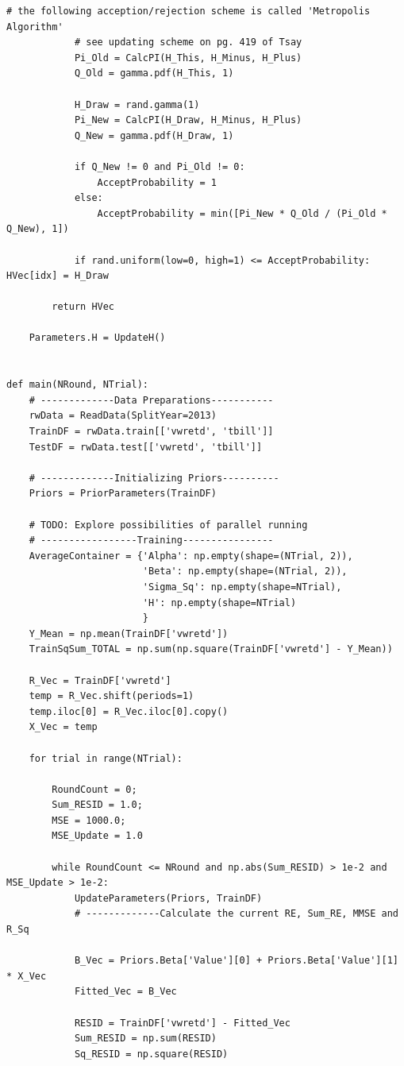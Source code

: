 \documentclass[letterpaper]{article}
\begin{document}
\begin{lstlisting}[label=lst:pythoncode]
            # the following acception/rejection scheme is called 'Metropolis Algorithm'
            # see updating scheme on pg. 419 of Tsay
            Pi_Old = CalcPI(H_This, H_Minus, H_Plus)
            Q_Old = gamma.pdf(H_This, 1)

            H_Draw = rand.gamma(1)
            Pi_New = CalcPI(H_Draw, H_Minus, H_Plus)
            Q_New = gamma.pdf(H_Draw, 1)

            if Q_New != 0 and Pi_Old != 0:
                AcceptProbability = 1
            else:
                AcceptProbability = min([Pi_New * Q_Old / (Pi_Old * Q_New), 1])

            if rand.uniform(low=0, high=1) <= AcceptProbability:  HVec[idx] = H_Draw

        return HVec

    Parameters.H = UpdateH()


def main(NRound, NTrial):
    # -------------Data Preparations-----------
    rwData = ReadData(SplitYear=2013)
    TrainDF = rwData.train[['vwretd', 'tbill']]
    TestDF = rwData.test[['vwretd', 'tbill']]

    # -------------Initializing Priors----------
    Priors = PriorParameters(TrainDF)

    # TODO: Explore possibilities of parallel running
    # -----------------Training----------------
    AverageContainer = {'Alpha': np.empty(shape=(NTrial, 2)),
                        'Beta': np.empty(shape=(NTrial, 2)),
                        'Sigma_Sq': np.empty(shape=NTrial),
                        'H': np.empty(shape=NTrial)
                        }
    Y_Mean = np.mean(TrainDF['vwretd'])
    TrainSqSum_TOTAL = np.sum(np.square(TrainDF['vwretd'] - Y_Mean))

    R_Vec = TrainDF['vwretd']
    temp = R_Vec.shift(periods=1)
    temp.iloc[0] = R_Vec.iloc[0].copy()
    X_Vec = temp

    for trial in range(NTrial):

        RoundCount = 0;
        Sum_RESID = 1.0;
        MSE = 1000.0;
        MSE_Update = 1.0

        while RoundCount <= NRound and np.abs(Sum_RESID) > 1e-2 and MSE_Update > 1e-2:
            UpdateParameters(Priors, TrainDF)
            # -------------Calculate the current RE, Sum_RE, MMSE and R_Sq

            B_Vec = Priors.Beta['Value'][0] + Priors.Beta['Value'][1] * X_Vec
            Fitted_Vec = B_Vec

            RESID = TrainDF['vwretd'] - Fitted_Vec
            Sum_RESID = np.sum(RESID)
            Sq_RESID = np.square(RESID)


\end{lstlisting}
\end{document}
